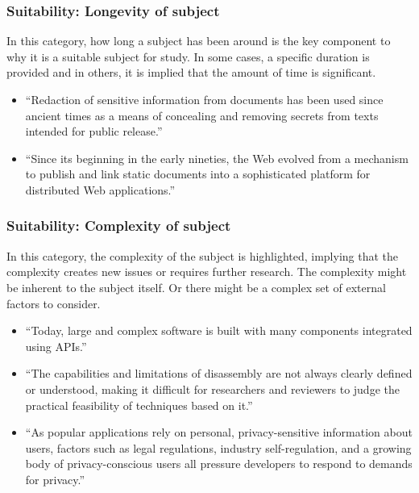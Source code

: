 \documentclass[sigconf]{acmart}
\begin{document}
	\subsubsection{Suitability: Longevity of subject }

	In this category, how long a subject has been around is the key component to why it is a suitable subject for study. In some cases, a specific duration is provided and in others, it is implied that the amount of time is significant.
	\begin{itemize}
		\item ``Redaction of sensitive information from documents has been used since ancient times as a means of concealing and removing secrets from texts intended for public release.''~\cite{araujo2015compiler}

		\item	``Since its beginning in the early nineties, the Web evolved from a mechanism to publish and link static documents into a sophisticated platform for distributed Web applications.''~\cite{lekies2015unexpected}
	\end{itemize}


	\subsubsection{Suitability: Complexity of subject}

	In this category, the complexity of the subject is highlighted, implying that the complexity creates new issues or requires further research. The complexity might be inherent to the subject itself. Or there might be a complex set of external factors to consider.
	\begin{itemize}
		\item 	``Today, large and complex software is built with many components integrated using APIs.''~\cite{yun2016apisan}

		\item ``The capabilities and limitations of disassembly are not always clearly defined or understood, making it difficult for researchers and reviewers to judge the practical feasibility of techniques based on it.''~\cite{andriesse2016depth}

		\item 	``As popular applications rely on personal, privacy-sensitive information about users, factors such as legal regulations, industry self-regulation, and a growing body of privacy-conscious users all pressure developers to respond to demands for privacy.''~\cite{fredrikson2014zo}
	\end{itemize}
\end{document}
